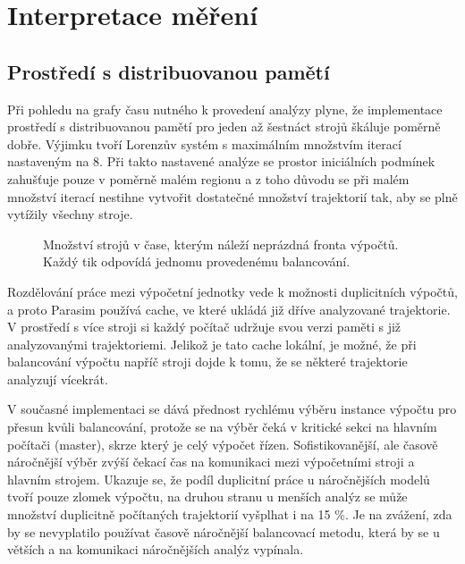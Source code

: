\section{Interpretace měření}

\subsection{Prostředí s distribuovanou pamětí}

Při pohledu na grafy času nutného k provedení analýzy plyne, že implementace
prostředí s distribuovanou pamětí pro jeden až šestnáct strojů šká\-lu\-je poměrně dobře. Výjimku tvoří
Lorenzův systém s maximálním množ\-stvím iterací nastaveným na 8. Při takto nastavené analýze
se prostor ini\-ci\-ál\-ních podmínek zahušťuje pouze v poměrně malém regionu a z toho důvodu se při
malém množství iterací nestihne vytvořit dostatečné množ\-ství trajektorií tak, aby se plně
vytížily všechny stroje. 

\begin{figure}[h!]
\begin{center}
\caption{Množství strojů v čase, kterým náleží neprázdná fronta výpočtů. Každý tik odpovídá jednomu provedenému balancování.}
\end{center}
\end{figure}

Rozdělování práce mezi výpočetní jednotky vede k možnosti du\-pli\-cit\-ních výpočtů,
a proto Parasim používá cache, ve které ukládá již dříve analyzované trajektorie.
V prostředí s více stroji si každý počítač udržuje svou verzi paměti s již
analyzovanými trajektoriemi. Jelikož je tato cache lokální, je možné, že při balancování
výpočtu napříč stroji dojde k tomu, že se některé trajektorie analyzují vícekrát.

V současné implementaci se dává přednost rychlému výběru instance výpočtu pro
přesun kvůli balancování, protože se na výběr čeká v kritické sekci na hlavním
počítači (master), skrze který je celý výpočet řízen. Sofistikovanější, ale časově
náročnější výběr zvýší čekací čas na komunikaci mezi výpočetními stroji a hlavním strojem.
Ukazuje se, že podíl duplicitní práce u náročnějších modelů tvoří pouze zlomek výpočtu,
na druhou stranu u menších analýz se může množství duplicitně počítaných trajektorií
vyšplhat i na 15 \%. Je na zvážení, zda by se nevyplatilo používat časově náročnější
balancovací metodu, která by se u větších a na komunikaci náročnějších analýz vypínala.

